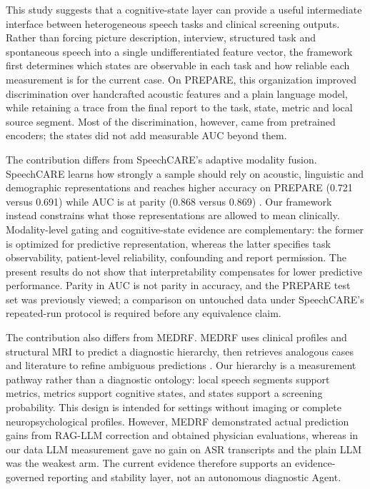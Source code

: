 \documentclass[pdflatex,sn-nature]{sn-jnl}
\begin{document}
This study suggests that a cognitive-state layer can provide a useful intermediate interface between heterogeneous speech tasks and clinical screening outputs. Rather than forcing picture description, interview, structured task and spontaneous speech into a single undifferentiated feature vector, the framework first determines which states are observable in each task and how reliable each measurement is for the current case. On PREPARE, this organization improved discrimination over handcrafted acoustic features and a plain language model, while retaining a trace from the final report to the task, state, metric and local source segment. Most of the discrimination, however, came from pretrained encoders; the states did not add measurable AUC beyond them.

The contribution differs from SpeechCARE's adaptive modality fusion. SpeechCARE learns how strongly a sample should rely on acoustic, linguistic and demographic representations and reaches higher accuracy on PREPARE (0.721 versus 0.691) while AUC is at parity (0.868 versus 0.869) \cite{Azadmaleki2025}. Our framework instead constrains what those representations are allowed to mean clinically. Modality-level gating and cognitive-state evidence are complementary: the former is optimized for predictive representation, whereas the latter specifies task observability, patient-level reliability, confounding and report permission. The present results do not show that interpretability compensates for lower predictive performance. Parity in AUC is not parity in accuracy, and the PREPARE test set was previously viewed; a comparison on untouched data under SpeechCARE's repeated-run protocol is required before any equivalence claim.

The contribution also differs from MEDRF. MEDRF uses clinical profiles and structural MRI to predict a diagnostic hierarchy, then retrieves analogous cases and literature to refine ambiguous predictions \cite{Hu2026}. Our hierarchy is a measurement pathway rather than a diagnostic ontology: local speech segments support metrics, metrics support cognitive states, and states support a screening probability. This design is intended for settings without imaging or complete neuropsychological profiles. However, MEDRF demonstrated actual prediction gains from RAG-LLM correction and obtained physician evaluations, whereas in our data LLM measurement gave no gain on ASR transcripts and the plain LLM was the weakest arm. The current evidence therefore supports an evidence-governed reporting and stability layer, not an autonomous diagnostic Agent.
\end{document}
